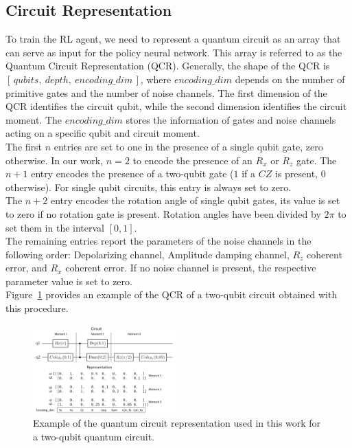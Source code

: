 \documentclass[referee,sn-basic]{sn-jnl} %
\begin{document}

\subsection{Circuit Representation}
To train the RL agent, we need to represent a quantum circuit as an array that can serve as input for the policy neural network. 
This array is referred to as the Quantum Circuit Representation (QCR). 
Generally, the shape of the QCR is $[\,qubits,\: depth,\: encoding\_dim\,]$, where $encoding\_dim$ depends on the number of primitive gates 
and the number of noise channels. 
The first dimension of the QCR identifies the circuit qubit, while the second dimension identifies the circuit moment. 
The $encoding\_dim$ stores the information of gates and noise channels acting on a specific qubit and circuit moment.\\
The first $n$ entries are set to one in the presence of a single qubit gate, zero otherwise. 
In our work, $n=2$ to encode the presence of an $R_x$ or $R_z$ gate. The $n+1$ entry encodes the presence of a two-qubit gate 
($1$ if a $CZ$ is present, $0$ otherwise). For single qubit circuits, this entry is always set to zero. \\
The $n+2$ entry encodes the rotation angle of single qubit gates, its value is set to zero if no rotation gate is present. 
Rotation angles have been divided by $2\pi$ to set them in the interval $[0,1]$. \\
The remaining entries report the parameters of the noise channels in the following order: Depolarizing channel, Amplitude damping channel, $R_z$ coherent error, and $R_x$ coherent error. 
If no noise channel is present, the respective parameter value is set to zero. \\
Figure~\ref{fig_qcr} provides an example of the QCR of a two-qubit circuit obtained with this procedure.

\begin{figure}
    \centering
    \includegraphics[width=0.49\textwidth]{circuit_representation.png}
    \caption{Example of the quantum circuit representation used in this work for a two-qubit quantum circuit.}\label{fig_qcr}
\end{figure}
\end{document}
